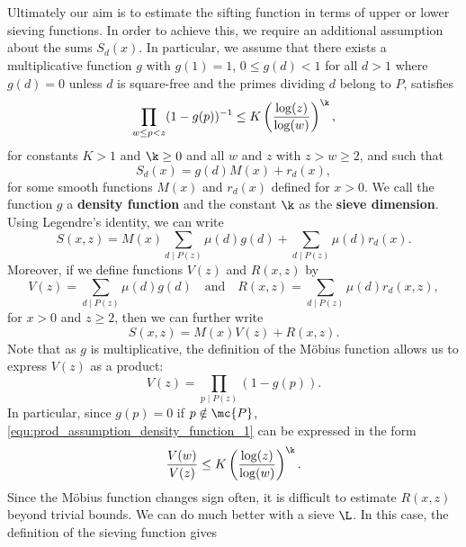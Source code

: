   \section{}
    Ultimately our aim is to estimate the sifting function in terms of upper or lower sieving functions. In order to achieve this, we require an additional assumption about the sums $S_{d}(x)$. In particular, we assume that there exists a multiplicative function $g$ with $g(1) = 1$, $0 \le g(d) < 1$ for all $d > 1$ where $g(d) = 0$ unless $d$ is square-free and the primes dividing $d$ belong to ${P}$, satisfies
    \begin{equation}\label{equ:prod_assumption_density_function_1}
      \prod_{w \le p < z}(1-g(p))^{-1} \le K\left(\frac{\log(z)}{\log(w)}\right)^{\k},
    \end{equation}
    for constants $K > 1$ and $\k \ge 0$ and all $w$ and $z$ with $z > w \ge 2$, and such that  
    \begin{equation}\label{equ:d_multiple_sifting_function}
      S_{d}(x) = g(d)M(x)+r_{d}(x),
    \end{equation}
    for some smooth functions $M(x)$ and $r_{d}(x)$ defined for $x > 0$. We call the function $g$ a \textbf{density function} and the constant $\k$ as the \textbf{sieve dimension}. Using Legendre's identity, we can write
    \[
      S(x,z) = M(x)\sum_{d \mid P(z)}\mu(d)g(d)+\sum_{d \mid P(z)}\mu(d)r_{d}(x).
    \]
    Moreover, if we define functions $V(z)$ and $R(x,z)$ by
    \[
      V(z) = \sum_{d \mid P(z)}\mu(d)g(d) \quad \text{and} \quad R(x,z) = \sum_{d \mid P(z)}\mu(d)r_{d}(x,z),
    \]
    for $x > 0$ and $z \ge 2$, then we can further write
    \[
      S(x,z) = M(x)V(z)+R(x,z).
    \]
    Note that as $g$ is multiplicative, the definition of the M\"obius function allows us to express $V(z)$ as a product:
    \begin{equation}\label{equ:V_product_formula}
      V(z) = \prod_{p \mid P(z)}(1-g(p)).
    \end{equation}
    In particular, since $g(p) = 0$ if $p \notin \mc{P}$, \cref{equ:prod_assumption_density_function_1} can be expressed in the form
    \begin{equation}\label{equ:prod_assumption_density_function_2}
      \frac{V(w)}{V(z)} \le K\left(\frac{\log(z)}{\log(w)}\right)^{\k}.
    \end{equation}
    Since the M\"obius function changes sign often, it is difficult to estimate $R(x,z)$ beyond trivial bounds. We can do much better with a sieve $\L$. In this case, the definition of the sieving function gives

